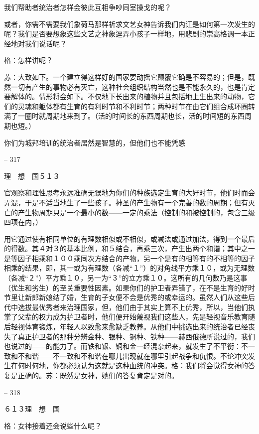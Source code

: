 \documentclass[11pt,oneside]{book}
\begin{document}
\begin{common-format}
    我们帮助者统治者怎样会彼此互相争吵同室操戈的呢？

    或者，你需不需要我们象荷马那样祈求文艺女神告诉我们内讧是如何第一次发生的呢？我们是否要想象这些文艺之神象逗弄小孩子一样地，用悲剧的崇高格调一本正经地对我们说话呢？

    格：怎样讲呢？

    苏：大致如下。一个建立得这样好的国家要动摇它颠覆它确是不容易的；但是，既然一切有产生的事物必有灭亡，这种社会组织结构当然也是不能永久的，也是肯定要解体的。情形将会如下。不仅地下长出来的植物并且包括地上生出来的动物，它们的灵魂和躯体都有生育的有利时节和不利时节；两种时节在由它们组合成环圈转满了一圈时就周期地来到了。（活的时间长的东西周期也长，活的时间短的东西周期也短。）

    你们为城邦培训的统治者居然是智慧的，但他们也不能凭感

    

-- 317

    理　想　国５１３

    官观察和理性思考永远准确无误地为你们的种族选定生育的大好时节，他们时而会弄混，于是不适当地生了一些孩子。神圣的产生物有一个完善的数的周期；但有灭亡的产生物周期只是一个最小的数——一定的乘法（控制的和被控制的，包含三级四项在内，）

    用它通过使有相同单位的有理数相似或不相似，或减法或通过加法，得到一个最后的得数。其４对３的基本比例，和５结合，再乘三次，产生出两个和谐；其中之一是等因子相乘和１００乘同次方结合的产物，另一个是有的相等有的不相等的因子相乘的结果，即，其一或为有理数（各减“１”）的对角线平方乘１０，或为无理数（各减“２”）平方乘１０，另一为“３”的立方乘１０。这所有的几何数乃是这事（优生和劣生）的至关重要性因素。如果你们的护卫者弄错了，在不是生育的好时节里让新郎新娘结了婚，生育的子女便不会是优秀的或幸运的。虽然人们从这些后代中选拔最优秀者来治理国家，但，他们由于其实上算不上优秀，所以，当他们执掌了父辈的权力成为护卫者时，他们便开始蔑视我们这些人，先是轻视音乐教育随后轻视体育锻炼，年轻人以致愈来愈缺乏教养。从他们中挑选出来的统治者已经丧失了真正护卫者的那种分辨金种、银种、铜种、铁种——赫西俄德所说过的，我们也说过的——的能力了。而铁和银、铜和金一经混杂起来，就发生了不平衡：不一致和不和谐——不一致和不和谐在哪儿出现就在哪里引起战争和仇恨。不论冲突发生在何时何地，你都必须认为这就是这种血统的冲突。格：我们将会觉得女神的答复是正确的。苏：既然是女神，她们的答复肯定是对的。

    

-- 318

    ６１３理　想　国

    格：女神接着还会说些什么呢？


\end{common-format}
\end{document}
